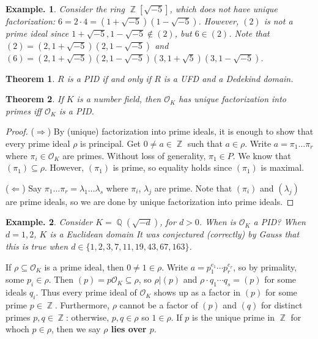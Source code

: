 \documentclass[11pt, a4paper]{memoir}
\DeclareMathOperator{\Q}{{\mathbb{Q}}}
\DeclareMathOperator{\Z}{{\mathbb{Z}}}
\theoremstyle{change}
\newtheorem{theorem}{Theorem}[section]
\theoremstyle{plain}
\theoremstyle{nonumberplain}
\newtheorem{example}{Example.}
\newtheorem{proof}{Proof}
\begin{document}
\begin{example}
    Consider the ring $\Z[\sqrt{-5}]$, which does not have unique factorization: $6=2\cdot 4=(1+\sqrt{-5})(1-\sqrt{-5})$.
    However, $(2)$ is not a prime ideal since $1+\sqrt{-5},1-\sqrt{-5}\notin(2)$, but $6\in(2)$.
    Note that $(2)=(2,1+\sqrt{-5})(2,1-\sqrt{-5})$ and $(6)=(2,1+\sqrt{-5})(2,1-\sqrt{-5})(3,1+\sqrt{5})(3,1-\sqrt{-5})$.
\end{example}
\begin{theorem}
    $R$ is a PID if and only if $R$ is a UFD and a Dedekind domain.
\end{theorem}
\begin{theorem}
    If $K$ is a number field, then $\mathcal{O}_K$ has unique factorization into primes iff $\mathcal{O}_K$ is a PID.
\end{theorem}
\begin{proof}
    ($\Rightarrow$) By (unique) factorization into prime ideals, it is enough to show that every prime ideal $\rho$ is principal.
    Get $0\neq a\in\Z$ such that $a\in\rho$.
    Write $a=\pi_1\ldots\pi_r$ where $\pi_i\in\mathcal{O}_K$ are primes.
    Without loss of generality, $\pi_1\in P$.
    We know that $(\pi_1)\subseteq\rho$.
    However, $(\pi_1)$ is prime, so equality holds since $(\pi_1)$ is maximal.

    ($\Leftarrow$) Say $\pi_1\ldots\pi_r=\lambda_1\ldots\lambda_s$ where $\pi_i$, $\lambda_j$ are prime.
    Note that $(\pi_i)$ and $(\lambda_j)$ are prime ideals, so we are done by unique factorization into prime ideals.
\end{proof}
\begin{example}
    Consider $K=\Q(\sqrt{-d})$, for $d>0$.
    When is $\mathcal{O}_K$ a PID?
    When $d=1,2$, $K$ is a Euclidean domain
    It was conjectured (correctly) by Gauss that this is true when $d\in\{1,2,3,7,11,19,43,67,163\}$.
\end{example}
If $\rho\subseteq\mathcal{O}_K$ is a prime ideal, then $0\neq 1\in\rho$.
Write $a=p_1^{e_1}\cdots p_r^{e_r}$, so by primality, some $p_i\in\rho$.
Then $(p)=p\mathcal{O}_K\subseteq\rho$, so $\rho|(p)$ and $\rho\cdot q_1\cdots q_s=(p)$ for some ideals $q_i$.
Thus every prime ideal of $\mathcal{O}_K$ shows up as a factor in $(p)$ for some prime $p\in\Z$.
Furthermore, $\rho$ cannot be a factor of $(p)$ and $(q)$ for distinct primes $p,q\in\Z$: otherwise, $p,q\in\rho$ so $1\in\rho$.
If $p$ is the unique prime in $\Z$ for whoch $p\in\rho$, then we say \textbf{$\rho$ lies over $p$}.
\end{document}

